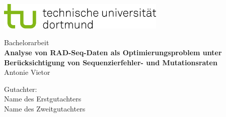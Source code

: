 \begin{titlepage}
	\vspace*{-2cm}
	\newlength{\links}
	\setlength{\links}{-1.5cm}
	\sffamily
	\hspace*{\links}
	\begin{minipage}{12.5cm}
		\includegraphics[width=8cm]{bilder/tud_logo_rgb}
	\end{minipage}

	\vspace*{4.5cm}

	\hspace*{\links}
	\hspace*{-0.7cm}
	\begin{minipage}{17cm}
		\large	
		\begin{center}
			{\Large Bachelorarbeit} \\
			\vspace*{1cm}
			\textbf{Analyse von RAD-Seq-Daten als Optimierungsproblem unter  Berücksichtigung von Sequenzierfehler- und Mutationsraten} \\
			\vspace*{1cm}
			Antonie Vietor
		\end{center}
	\end{minipage}
	\normalsize
	\vspace*{4.5cm}



	\vspace*{3.5cm}

	\hspace*{\links}
	\begin{minipage}[b]{8cm}
		\raggedright
		Gutachter: \\
		Name des Erstgutachters \\
		Name des Zweitgutachters \\
	\end{minipage}
	

\end{titlepage}
